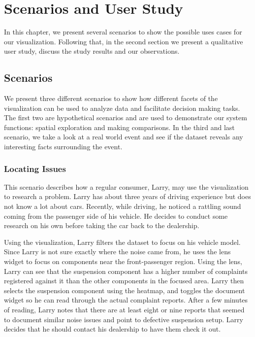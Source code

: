 
\chapter{Scenarios and User Study}
In this chapter, we present several scenarios to show the possible uses cases
for our visualization. Following that, in the second section we present a
qualitative user study, discuss the study results and our observations.

\section{Scenarios}
We present three different scenarios to show how different facets of the
visualization can be used to analyze data and facilitate decision making tasks.
The first two are hypothetical scenarios and are used to demonstrate our system
functions: spatial exploration and making comparisons. In the third and last
scenario, we take a look at a real world event and see if the dataset reveals
any interesting facts surrounding the event.

 
\subsection{Locating Issues}
This scenario describes how a regular consumer, Larry, may use the 
visualization to research a problem. Larry has about three years of driving 
experience but does not know a lot about cars. Recently, while driving, he 
noticed a rattling sound coming from the passenger side of his vehicle. 
He decides to conduct some research on his own before taking the car back 
to the dealership.

Using the visualization, Larry filters the dataset to focus on his
vehicle model. Since Larry is not sure exactly where the noise came from, 
he uses the lens widget to focus on components near the front-passenger 
region. Using the lens, Larry can see that the suspension component has a
higher number of complaints registered against it than the other components 
in the focused area. Larry then selects the suspension component using 
the heatmap, and toggles the document widget so he can read through the 
actual complaint reports. After a few minutes of reading, Larry notes that
there are at least eight or nine reports that seemed to document similar noise 
issues and point to defective suspension setup. Larry decides that he 
should contact his dealership to have them check it out.

